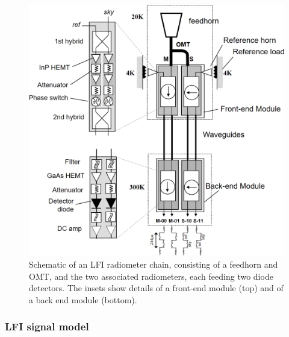 \documentclass[onecolumn]{aa}
\begin{document}

\begin{figure}[t]
	\center
	\includegraphics[width=0.5\linewidth]{figs/RADIOMETER-SCHEME.png}
	\caption{Schematic of an LFI radiometer chain, consisting of a feedhorn and OMT, and the two associated radiometers, each feeding two diode detectors. The insets show details of a front-end module (top) and of a back end module (bottom). }
	\label{fig:RADIOMETER-SCHEME}
\end{figure}


\subsubsection{LFI signal model}
\label{sec:lfi_signal_model}
\end{document}
